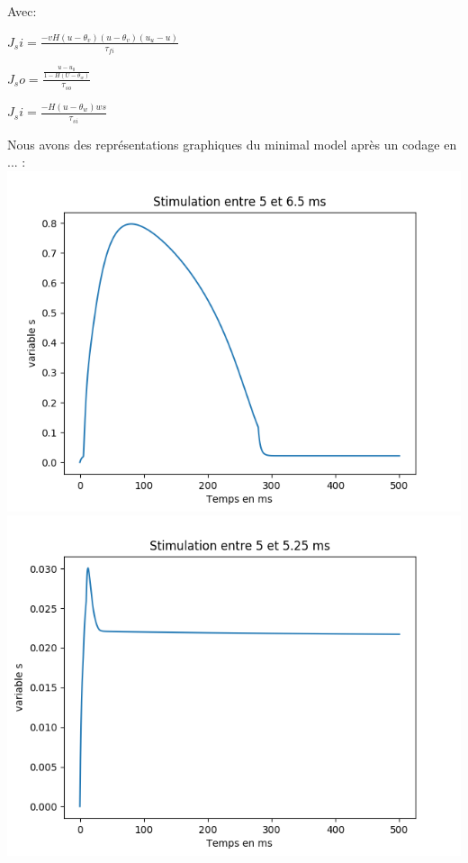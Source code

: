 \documentclass[a4paper,12pt,twoside]{report}
\begin{document}
Avec:

$J_si=\frac{-vH(u-\theta_v)(u-\theta_v)(u_u-u)}{\tau_{fi}}$


$J_so=\frac{\frac{u-u_0}{1-H(U-\theta_w)}}{\tau_{so}}$


$J_si=\frac{-H(u-\theta_w)ws}{\tau_{si}}$


Nous avons des représentations graphiques du minimal model après un codage en ... :\\



\includegraphics[scale=0.5]{./s(t).png}\\
\includegraphics[scale=0.5]{./s(t)_2.png}\\
\end{document}
